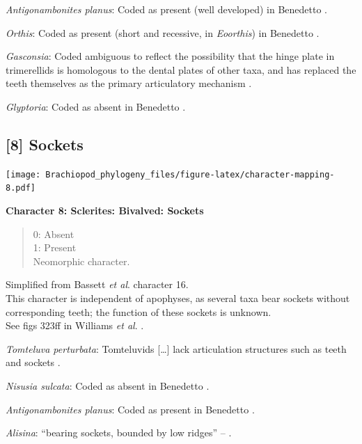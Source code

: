 \documentclass[]{book}
\theoremstyle{definition}
\theoremstyle{definition}
\theoremstyle{definition}
\theoremstyle{remark}
\begin{document}
\emph{Antigonambonites planus}: Coded as present (well developed) in
Benedetto \citeyearpar{Benedetto2009iChaniella}.

\emph{Orthis}: Coded as present (short and recessive, in
\emph{Eoorthis}) in Benedetto \citeyearpar{Benedetto2009iChaniella}.

\emph{Gasconsia}: Coded ambiguous to reflect the possibility that the
hinge plate in trimerellids is homologous to the dental plates of other
taxa, and has replaced the teeth themselves as the primary articulatory
mechanism \citep[see][p.~184, for details of the
articulation]{Williams2000BrachiopodaLinguliformea}.

\emph{Glyptoria}: Coded as absent in Benedetto
\citeyearpar{Benedetto2009iChaniella}.

\hypertarget{sockets}{%
\subsection*{{[}8{]} Sockets}\label{sockets}}

\texttt{[image: Brachiopod\_phylogeny\_files/figure-latex/character-mapping-8.pdf]}

\textbf{Character 8: Sclerites: Bivalved: Sockets}

\begin{quote}
0: Absent\\
1: Present\\
Neomorphic character.
\end{quote}

Simplified from Bassett \emph{et al}.
\citeyearpar{Bassett2001Functionalmorphology} character 16.\\
This character is independent of apophyses, as several taxa bear sockets
without corresponding teeth; the function of these sockets is unknown.\\
See figs 323ff in Williams \emph{et al}.
\citeyearpar{Williams1997BrachiopodaRevised}.

\emph{Tomteluva perturbata}: Tomteluvids {[}\ldots{}{]} lack
articulation structures such as teeth and sockets
\citep{Streng2016Anew}.

\emph{Nisusia sulcata}: Coded as absent in Benedetto
\citeyearpar{Benedetto2009iChaniella}.

\emph{Antigonambonites planus}: Coded as present in Benedetto
\citeyearpar{Benedetto2009iChaniella}.

\emph{Alisina}: ``bearing sockets, bounded by low ridges'' --
\citet{Williams2000BrachiopodaLinguliformea}.
\end{document}
